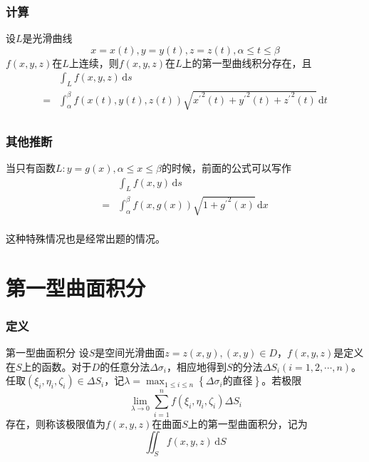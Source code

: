 \documentclass[xetex]{beamer}
\begin{document}
    \begin{frame}
        \frametitle{计算}
    
        设$L$是光滑曲线
        $$x=x(t), y=y(t), z=z(t), \alpha \leq t \leq \beta$$
        $f(x,y,z)$在$L$上连续，则$f(x,y,z)$在$L$上的第一型曲线积分存在，且
        \begin{align*}
            &\int_Lf(x,y,z)\, \textrm{d}s \\
            =&\int_\alpha^\beta f(x(t), y(t), z(t))\sqrt{{x^\prime}^2(t) + {y^\prime}^2(t) + {z^\prime}^2(t)}\, \textrm{d}t\\
        \end{align*}
    
    \end{frame}

    \begin{frame}
        \frametitle{其他推断}
    
        当只有函数$L: y=g(x), \alpha \leq x \leq \beta$的时候，前面的公式可以写作
        \begin{align*}
            &\int_Lf(x,y)\, \textrm{d}s \\
            =&\int_\alpha^\beta f(x, g(x))\sqrt{1 + {g^\prime}^2(x)}\, \textrm{d}x\\
        \end{align*}

        这种特殊情况也是经常出题的情况。
    
    \end{frame}

    \section{第一型曲面积分}

    \begin{frame}
        \frametitle{定义}
    
        \begin{block}{第一型曲面积分}
            设$S$是空间光滑曲面$z=z(x,y), (x,y)\in D$，$f(x,y,z)$是定义在$S$上的函数。对于$D$的任意分法$\Delta \sigma_i$，相应地得到$S$的分法$\Delta S_i(i=1,2,\cdots, n)$。任取$(\xi_i, \eta_i, \zeta_i)\in\Delta S_i$，记$\displaystyle\lambda = \max_{1\leq i \leq n}\left\{\Delta \sigma_i\text{的直径}\right\}$。若极限
            $$\lim_{\lambda \to 0}\sum_{i=1}^{n}f(\xi_i, \eta_i, \zeta_i)\Delta S_i$$
            存在，则称该极限值为$f(x,y,z)$在曲面$S$上的\alert{第一型曲面积分}，记为
            $$\iint_Sf(x,y,z)\, \textrm{d}S$$
        \end{block}
    
    \end{frame}
\end{document}
